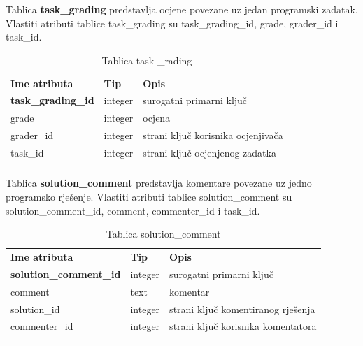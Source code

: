\documentclass[times, utf8, zavrsni, numeric]{fer}
\begin{document}
		Tablica \textbf{task\_grading} predstavlja ocjene povezane uz jedan programski zadatak. Vlastiti atributi tablice task\_grading su task\_grading\_id, grade, grader\_id i task\_id. 
		\begin{table}[H]
			\caption{Tablica task \_rading}
			\label{tbl:taskgrading}
			\centering
			\begin{tabu} to \textwidth {XXX}
				\tabucline[1.75pt]{-}
				\textbf{Ime atributa} & \textbf{Tip} & \textbf{Opis}\\ 				
				\tabucline[1.75pt]{-}
				\textbf{task\_grading\_id} & integer & surogatni primarni ključ\\ \hline
				grade & integer & ocjena\\ \hline
				grader\_id & integer & strani ključ korisnika ocjenjivača\\ \hline
				task\_id & integer & strani ključ ocjenjenog zadatka\\ \hline
				\tabucline[1.75pt]{-}
			\end{tabu}
		\end{table}
	
		Tablica \textbf{solution\_comment} predstavlja komentare povezane uz jedno programsko rješenje. Vlastiti atributi tablice solution\_comment su solution\_comment\_id, comment, commenter\_id i task\_id. 
		\begin{table}[H]
			\caption{Tablica solution\_comment}
			\label{tbl:solutioncomment}
			\centering
			\begin{tabu} to \textwidth {XXX}
				\tabucline[1.75pt]{-}
				\textbf{Ime atributa} & \textbf{Tip} & \textbf{Opis}\\ 				
				\tabucline[1.75pt]{-}
				\textbf{solution\_comment\_id} & integer & surogatni primarni ključ\\ \hline
				comment & text & komentar\\ \hline
				solution\_id & integer & strani ključ komentiranog rješenja\\ \hline
				commenter\_id & integer & strani ključ korisnika komentatora\\ \hline
				\tabucline[1.75pt]{-}
			\end{tabu}
		\end{table}
	
\end{document}

